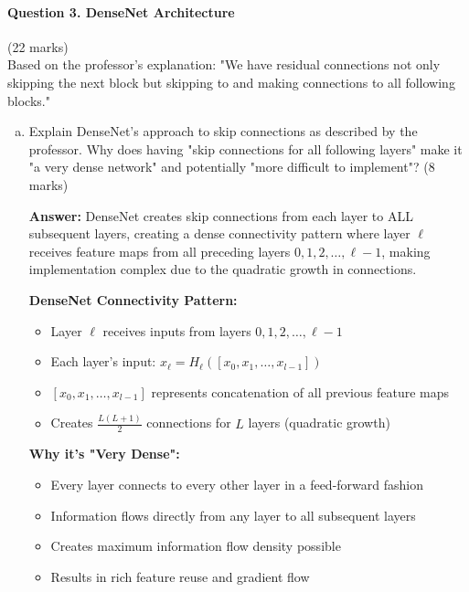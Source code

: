 \documentclass[12pt]{article}
\newcommand{\answer}[1]{{\color{answercolor}\textbf{Answer:} #1}}
\newcommand{\explanation}[1]{{\color{explanationcolor}#1}}
\begin{document}
\newpage
\paragraph{Question 3. DenseNet Architecture}{\hfill (22 marks)}\\
Based on the professor's explanation: "We have residual connections not only skipping the next block but skipping to and making connections to all following blocks."

\begin{enumerate}[(a)]
    \item Explain DenseNet's approach to skip connections as described by the professor. Why does having "skip connections for all following layers" make it "a very dense network" and potentially "more difficult to implement"? \hfill (8 marks)
    
    \answer{DenseNet creates skip connections from each layer to ALL subsequent layers, creating a dense connectivity pattern where layer $\ell$ receives feature maps from all preceding layers $0, 1, 2, \ldots, \ell-1$, making implementation complex due to the quadratic growth in connections.}
    
    \explanation{
    \textbf{DenseNet Connectivity Pattern:}
    \begin{itemize}
        \item Layer $\ell$ receives inputs from layers $0, 1, 2, \ldots, \ell-1$
        \item Each layer's input: $x_\ell = H_\ell([x_0, x_1, \ldots, x_{l-1}])$
        \item $[x_0, x_1, \ldots, x_{l-1}]$ represents concatenation of all previous feature maps
        \item Creates $\frac{L(L+1)}{2}$ connections for $L$ layers (quadratic growth)
    \end{itemize}
    
    \textbf{Why it's "Very Dense":}
    \begin{itemize}
        \item Every layer connects to every other layer in a feed-forward fashion
        \item Information flows directly from any layer to all subsequent layers
        \item Creates maximum information flow density possible
        \item Results in rich feature reuse and gradient flow
    \end{itemize}
    
}
\end{enumerate}
\end{document}
